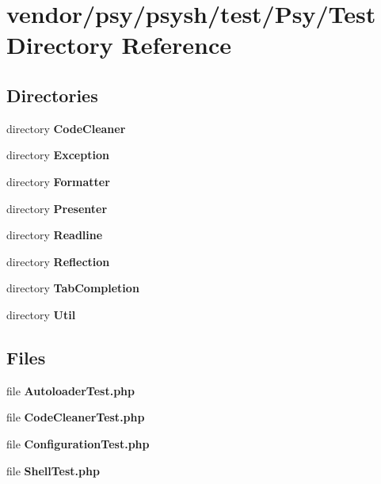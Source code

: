 \section{vendor/psy/psysh/test/\+Psy/\+Test Directory Reference}
\label{dir_da9f80ea3dc672e97ad16af2f4f684f6}
\subsection*{Directories}
\begin{DoxyCompactItemize}
\item 
directory {\bf Code\+Cleaner}
\item 
directory {\bf Exception}
\item 
directory {\bf Formatter}
\item 
directory {\bf Presenter}
\item 
directory {\bf Readline}
\item 
directory {\bf Reflection}
\item 
directory {\bf Tab\+Completion}
\item 
directory {\bf Util}
\end{DoxyCompactItemize}
\subsection*{Files}
\begin{DoxyCompactItemize}
\item 
file {\bf Autoloader\+Test.\+php}
\item 
file {\bf Code\+Cleaner\+Test.\+php}
\item 
file {\bf Configuration\+Test.\+php}
\item 
file {\bf Shell\+Test.\+php}
\end{DoxyCompactItemize}

